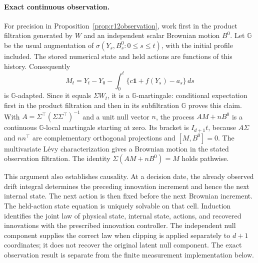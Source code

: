 \paragraph*{Exact continuous observation.}
For precision in Proposition~\ref{prop:r12observation}, work first in
the product filtration generated by $W$ and an independent scalar
Brownian motion $B^0$. Let $\mathbb G$ be the usual augmentation of
$\sigma(Y_s,B_s^0:0\leq s\leq t)$, with the initial profile included.
The stored numerical state and held actions are functions of this
history. Consequently
\[
 M_t=Y_t-Y_0-\int_0^t\{c\bm1+f(Y_s)-a_s\}\,ds
\]
is $\mathbb G$-adapted. Since it equals $\Sigma W_t$, it is a
$\mathbb G$-martingale: conditional expectation first in the product
filtration and then in its subfiltration $\mathbb G$ proves this claim.
With $A=\Sigma^\top(\Sigma\Sigma^\top)^{-1}$ and a unit null vector
$n$, the process $AM+nB^0$ is a continuous $\mathbb G$-local martingale
starting at zero. Its bracket is $I_{d+1}t$, because
$A\Sigma$ and $nn^\top$ are complementary orthogonal projections and
$[M,B^0]=0$. The multivariate L\'evy characterization gives a Brownian
motion in the stated observation filtration. The identity
$\Sigma(AM+nB^0)=M$ holds pathwise.

This argument also establishes causality. At a decision date, the
already observed drift integral determines the preceding innovation
increment and hence the next internal state. The next action is then
fixed before the next Brownian increment. The held-action state equation
is uniquely solvable on that cell. Induction identifies the joint law
of physical state, internal state, actions, and recovered innovations
with the prescribed innovation controller. The independent null
component supplies the correct law when clipping is applied separately
to $d+1$ coordinates; it does not recover the original latent null
component. The exact observation result is separate from the finite
measurement implementation below.
